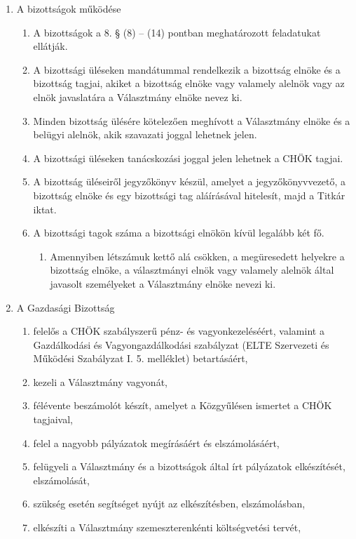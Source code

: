 \documentclass{../styles/rulebook}
\begin{document}
\begin{enumerate}
\begin{enumerate}
\begin{enumerate}
			\end{enumerate}
		\end{enumerate}
	\item A bizottságok működése
		\begin{enumerate}
		\item A bizottságok a 8. § (8) – (14) pontban meghatározott feladatukat ellátják.
		\item A bizottsági üléseken mandátummal rendelkezik a bizottság elnöke és a bizottság tagjai, akiket a bizottság elnöke vagy valamely alelnök vagy az elnök javaslatára a Választmány elnöke nevez ki. 
		\item Minden bizottság ülésére kötelezően meghívott a Választmány elnöke és a belügyi alelnök, akik szavazati joggal lehetnek jelen.
		\item A bizottsági üléseken tanácskozási joggal jelen lehetnek a CHÖK tagjai.
		\item A bizottság üléseiről jegyzőkönyv készül, amelyet a jegyzőkönyvvezető, a bizottság elnöke és egy bizottsági tag aláírásával hitelesít, majd a Titkár iktat.
		\item A bizottsági tagok száma a bizottsági elnökön kívül legalább két fő. 
			\begin{enumerate}
			\item Amennyiben létszámuk kettő alá csökken, a megüresedett helyekre a bizottság elnöke, a választmányi elnök vagy valamely alelnök által javasolt személyeket a Választmány elnöke nevezi ki.
			\end{enumerate}
		\end{enumerate}
	\item A Gazdasági Bizottság
	\begin{enumerate}
		\item felelős a CHÖK szabályszerű pénz- és vagyonkezeléséért, valamint a Gazdálkodási és Vagyongazdálkodási szabályzat (ELTE Szervezeti és Működési Szabályzat I. 5. melléklet) betartásáért,
		\item kezeli a Választmány vagyonát,
		\item félévente beszámolót készít, amelyet a Közgyűlésen ismertet a CHÖK tagjaival,
		\item felel a nagyobb pályázatok megírásáért és elszámolásáért,
		\item felügyeli a Választmány és a bizottságok által írt pályázatok elkészítését, elszámolását,
		\item szükség esetén segítséget nyújt az elkészítésben, elszámolásban,
		\item elkészíti a Választmány szemeszterenkénti költségvetési tervét,

\end{enumerate}
\end{enumerate}
\end{document}
